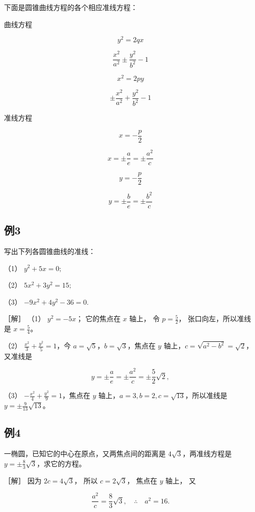 下面是圆锥曲线方程的各个相应准线方程：

曲线方程

\[
y^{2} = 2 q x
\]

\[
\frac {x^{2}}{a^{2}} \pm \frac {y^{2}}{b^{2}} - 1
\]

\[
x^{2} = 2 p y
\]

\[
\pm \frac {x^{2}}{a^{2}} + \frac {y^{2}}{b^{2}} - 1
\]

准线方程

\[
x = - \frac {p}{2}
\]

\[
x = \pm \frac {a}{e} = \pm \frac {a^{2}}{c}
\]

\[
y = - \frac {p}{2}
\]

\[
y = \pm \frac {b}{e} = \pm \frac {b^{2}}{c}
\]

\subsection{例3}\label{ux4f8b3-25}

写出下列各圆锥曲线的准线：

（1） \(y^{2}+5x=0;\)

（2） \(5x^{2} + 3y^{2} = 15;\)

（3） \(-9x^{2} + 4y^{2} - 36 = 0.\)

［解］ （1） \(y^{2} = -5x\)； 它的焦点在 \(x\) 轴上， 令
\(p = \frac{5}{2}\)， 张口向左，所以准线是 \(x=\frac{5}{4}\)。

（2） \(\frac{x^2}{3} + \frac{y^2}{5} = 1\)，今
\(a = \sqrt{5}\)，\(b = \sqrt{3}\)，焦点在 \(y\)
轴上，\(c = \sqrt{a^2 - b^2} = \sqrt{2}\)，又准线是

\[
y = \pm \frac {a}{e} = \pm \frac {a^{2}}{c} = \pm \frac {5}{2} \sqrt {2},
\]

（3） \(-\frac{x^2}{4} + \frac{y^2}{9} = 1\)，焦点在 \(y\)
轴上，\(a = 3, b = 2, c = \sqrt{13}\)，所以准线是
\(y = \pm \frac{9}{13}\sqrt{13}\)。

\subsection{例4}\label{ux4f8b4-18}

一椭圆，已知它的中心在原点，又两焦点间的距离是
\(4\sqrt{3}\)，两准线方程是
\(y = \pm \frac{8}{3}\sqrt{3}\)，求它的方程。

［解］ 因为 \(2c = 4\sqrt{3}\)， 所以 \(c = 2\sqrt{3}\)， 焦点在 \(y\)
轴上， 又

\[
\frac {a^{2}}{c} = \frac {8}{3} \sqrt {3}, \quad \therefore \quad a^{2} = 16.
\]

